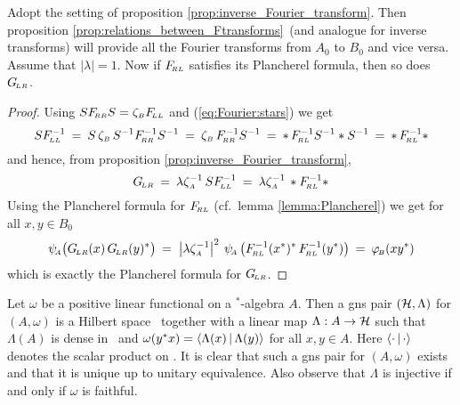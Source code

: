 \begin{lemma_sec} \label{lemma:Plancherel:inverse}
Adopt the setting of proposition \ref{prop:inverse_Fourier_transform}\@.
Then proposition \ref{prop:relations_between_Ftransforms}\
(and analogue for inverse transforms)
will provide all the Fourier transforms from\/ $A_0$ to\/ $B_0$ and vice versa.
Assume that\/ $|\lambda| = 1$.
Now if\/ $F_{\!\scriptscriptstyle RL}$ satisfies its Plancherel formula, then so does\/ $G_{\!\scriptscriptstyle LR}$.
\end{lemma_sec}
\begin{proof}
Using $S F_{\!\scriptscriptstyle RR} S = \zeta_{\scriptscriptstyle B} F_{\!\scriptscriptstyle LL}$ and (\ref{eq:Fourier:stars}) we get
$$ S F_{\!\scriptscriptstyle LL}^{-1}
     \:=\:  S \, \zeta_{\scriptscriptstyle B}\, S^{-1} F_{\!\scriptscriptstyle RR}^{-1} S^{-1}
     \:=\:  \zeta_{\scriptscriptstyle B}\, F_{\!\scriptscriptstyle RR}^{-1} S^{-1}
     \:=\:  *\,F_{\!\scriptscriptstyle RL}^{-1} S^{-1}* S^{-1}
     \:=\:  *\,F_{\!\scriptscriptstyle RL}^{-1}*  $$
and hence, from proposition \ref{prop:inverse_Fourier_transform},
\begin{equation}\label{eq:GLRandFRL}
  G_{\!\scriptscriptstyle LR} \:=\: \lambda \zeta_{\scriptscriptstyle A}^{-1} \, S F_{\!\scriptscriptstyle LL}^{-1}
         \:=\: \lambda \zeta_{\scriptscriptstyle A}^{-1} \, * F_{\!\scriptscriptstyle RL}^{-1}*
\end{equation}
Using the Plancherel formula for $F_{\!\scriptscriptstyle RL}$ (cf.\ lemma \ref{lemma:Plancherel})
we get for all $x,y \in B_0$
$$ \psiA \! \left(\GLR(x)\, \GLR(y)^* \vertM  \right)
    \:=\; \left|\lambda \zetaA^{-1}\right|^2 \:
          \psiA\left(\FRL^{-1}(x^*)^* \, \FRL^{-1}(y^*) \vertM \right)
    \:=\: \phiB(x y^*) $$
which is exactly the Plancherel formula for $G_{\!\scriptscriptstyle LR}$.
\end{proof}



\begin{defn_sec}
Let $\omega$ be a positive linear functional on a $^*$-algebra $A$.
Then a {\sc gns} pair $(\mathcal H,\Lambda)$ for $(A,\omega)$ is a Hilbert space
\Hs\ together with a linear map $\Lambda: A \rightarrow \mathcal H$ such that
$\Lambda(A)$ is dense in \Hs\ and
$\omega(y^*x) = \langle \Lambda(x) \,|\, \Lambda(y) \rangle$ for all $x,y\in A$.
Here $\langle \cdot \,|\, \cdot \rangle$ denotes the scalar product on \Hs\@.
It is clear that such a {\sc gns} pair for $(A,\omega)$ exists and
that it is unique up to unitary equivalence.
Also observe that $\Lambda$ is injective if and only if $\omega$ is faithful.
\end{defn_sec}


